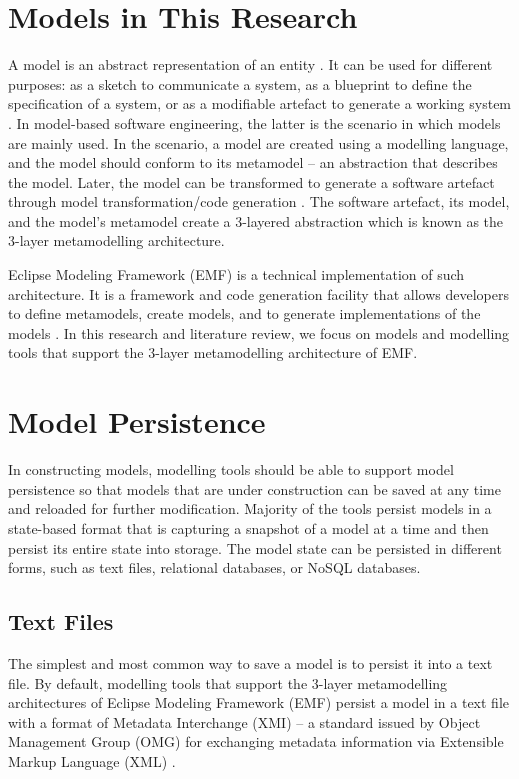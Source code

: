 \section{Models in This Research}
\label{sec:models_in_this_research)}

A model is an abstract representation of an entity \cite{volter2013model}. It can be used for different purposes: as a sketch to communicate a system, as a blueprint to define the specification of a system, or as a modifiable artefact to generate a working system \cite{fowler2019umlmode}. In model-based software engineering, the latter is the scenario in which models are mainly used. 
In the scenario, a model are created using a modelling language, and the model should conform to its metamodel -- an abstraction that describes the model. Later, the model can be transformed to generate a software artefact through model transformation/code generation \cite{brambilla2012model}. The software artefact, its model, and the model's metamodel create a 3-layered abstraction which is known as the 3-layer metamodelling architecture.  

Eclipse Modeling Framework (EMF) \cite{steinberg2008emf} is a technical implementation of such architecture. It is a framework and code generation facility that allows developers to define metamodels, create models, and to generate implementations of the models \cite{steinberg2008emf}. In this research and literature review, we focus on models and modelling tools that support the 3-layer metamodelling architecture of EMF.

\section{Model Persistence}
\label{sec:model_persistence}
In constructing models, modelling tools should be able to support model persistence so that models that are under construction can be saved at any time and reloaded for further modification. Majority of the tools persist models in a state-based format that is capturing a snapshot of a model at a time and then persist its entire state into storage. The model state can be persisted in different forms, such as text files, relational databases, or NoSQL databases.

\subsection{Text Files}
\label{sec:text_file}
The simplest and most common way to save a model is to persist it into a text file. By default, modelling tools that support the 3-layer metamodelling architectures of Eclipse Modeling Framework (EMF) \cite{steinberg2008emf} persist a model in a text file with a format of Metadata Interchange (XMI) -- a standard issued by Object Management Group (OMG) for exchanging metadata information via Extensible Markup Language (XML) \cite{omg2018xmi}. 

